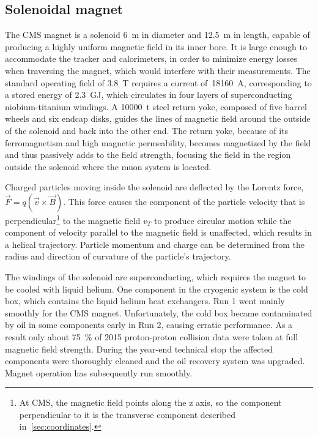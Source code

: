 \subsection{Solenoidal magnet}
The CMS magnet is a solenoid \SI{6}{\meter} in diameter and \SI{12.5}{\meter} in
length, capable of producing a highly uniform magnetic field in its inner bore.
It is large enough to accommodate the tracker and calorimeters, in order to
minimize energy losses when traversing the magnet, which would interfere with
their measurements. The standard operating field of \SI{3.8}{\tesla} requires a
current of~\SI{18160}{\ampere}, corresponding to a stored energy of
\SI{2.3}{\giga\joule}, which circulates in four layers of superconducting
niobium-titanium windings. A \SI{10000}{\tonne} steel return yoke, composed of
five barrel wheels and six endcap disks, guides the lines of magnetic field
around the outside of the solenoid and back into the other end. The return yoke,
because of its ferromagnetism and high magnetic permeability, becomes magnetized
by the field and thus passively adds to the field strength, focusing the field
in the region outside the solenoid where the muon system is located.

Charged particles moving inside the solenoid are deflected by the Lorentz force,
$\vec{F} = q(\vec{v} \times \vec{B})$. This force causes the component of the
particle velocity that is perpendicular\footnote{At CMS, the magnetic field
points along the z axis, so the component perpendicular to it is the transverse
component described in~\cref{sec:coordinates}.} to the magnetic field $v_T$ to
produce circular motion while the component of velocity parallel to the magnetic
field is unaffected, which results in a helical trajectory. Particle momentum
and charge can be determined from the radius and direction of curvature of the
particle's trajectory.

The windings of the solenoid are superconducting, which requires the magnet to
be cooled with liquid helium. One component in the cryogenic system is the cold
box, which contains the liquid helium heat exchangers. Run 1 went mainly
smoothly for the CMS magnet. Unfortunately, the cold box became contaminated by
oil in some components early in Run 2, causing erratic performance. As a result
only about \SI{75}{\percent} of 2015 proton-proton collision data were taken at
full magnetic field strength. During the year-end technical stop the affected
components were thoroughly cleaned and the oil recovery system was upgraded.
Magnet operation has subsequently run smoothly.

